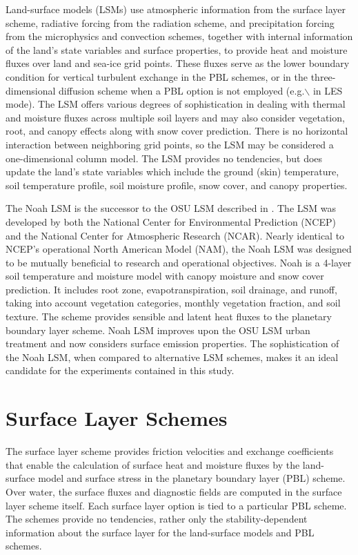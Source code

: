 Land-surface models (LSMs) use atmospheric information from the surface layer scheme, radiative forcing from the radiation scheme, and precipitation forcing from the microphysics and convection schemes, together with internal information of the land's state variables and surface properties, to provide heat and moisture fluxes over land and sea-ice grid points. These fluxes serve as the lower boundary condition for vertical turbulent exchange in the PBL schemes, or in the three-dimensional diffusion scheme when a PBL option is not employed (e.g.$\backslash$ in LES mode). The LSM offers various degrees of sophistication in dealing with thermal and moisture fluxes across multiple soil layers and may also consider vegetation, root, and canopy effects along with snow cover prediction. There is no horizontal interaction between neighboring grid points, so the LSM may be considered a one-dimensional column model. The LSM provides no tendencies, but does update the land's state variables which include the ground (skin) temperature, soil temperature profile, soil moisture profile, snow cover, and canopy properties.

The Noah LSM is the successor to the OSU LSM described in  \citet{ChenDud}. The LSM was developed by both the National Center for Environmental Prediction (NCEP) and the National Center for Atmospheric Research (NCAR). Nearly identical to NCEP's operational North American Model (NAM), the Noah LSM was designed to be mutually beneficial to research and operational objectives. Noah is a 4-layer soil temperature and moisture model with canopy moisture and snow cover prediction. It includes root zone, evapotranspiration, soil drainage, and runoff, taking into account vegetation categories, monthly vegetation fraction, and soil texture. The scheme provides sensible and latent heat fluxes to the planetary boundary layer scheme. Noah LSM improves upon the OSU LSM urban treatment and now considers surface emission properties. The sophistication of the Noah LSM, when compared to alternative LSM schemes, makes it an ideal candidate for the experiments contained in this study.

\section{Surface Layer Schemes}
\label{surface-layer-35}

The surface layer scheme provides friction velocities and exchange coefficients that enable the calculation of surface heat and moisture fluxes by the land-surface model and surface stress in the planetary boundary layer (PBL) scheme. Over water, the surface fluxes and diagnostic fields are computed in the surface layer scheme itself. Each surface layer option is tied to a particular PBL scheme. The schemes provide no tendencies, rather only the stability-dependent information about the surface layer for the land-surface models and PBL schemes.

